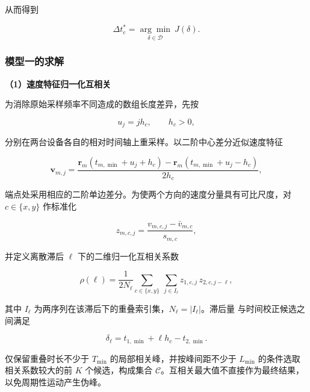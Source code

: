 从而得到

\begin{equation}
\Delta t_c^*=\underset{\delta\in\mathcal D}{\arg\min}\ J(\delta).
\label{eq:q1-optimum}
\end{equation}

\subsubsection{模型一的求解}\label{sec:q1-solution}

\noindent\textbf{（1）速度特征归一化互相关}

为消除原始采样频率不同造成的数组长度差异，先按

\begin{equation}
u_j=jh_c,\qquad h_c>0,
\label{eq:q1-corr-grid}
\end{equation}

分别在两台设备各自的相对时间轴上重采样。以二阶中心差分近似速度特征

\begin{equation}
\mathbf v_{m,j}=\frac{\mathbf r_m(t_{m,\min}+u_j+h_c)
-\mathbf r_m(t_{m,\min}+u_j-h_c)}{2h_c},
\label{eq:q1-velocity-feature}
\end{equation}

端点处采用相应的二阶单边差分。为使两个方向的速度分量具有可比尺度，对
\(c\in\{x,y\}\) 作标准化

\begin{equation}
z_{m,c,j}=\frac{v_{m,c,j}-\bar v_{m,c}}{s_{m,c}},
\label{eq:q1-standardized-velocity}
\end{equation}

并定义离散滞后 \(\ell\) 下的二维归一化互相关系数

\begin{equation}
\rho(\ell)=\frac{1}{2N_\ell}
\sum_{c\in\{x,y\}}\ \sum_{j\in I_\ell}
z_{1,c,j}\,z_{2,c,j-\ell},
\label{eq:q1-ncc}
\end{equation}

其中 \(I_\ell\) 为两序列在该滞后下的重叠索引集，\(N_\ell=|I_\ell|\)。滞后量
与时间校正候选之间满足

\begin{equation}
\delta_\ell=t_{1,\min}+\ell h_c-t_{2,\min}.
\label{eq:q1-lag-offset}
\end{equation}

仅保留重叠时长不少于 \(T_{\min}\) 的局部相关峰，并按峰间距不少于
\(L_{\min}\) 的条件选取相关系数较大的前 \(K\) 个候选，构成集合
\(\mathcal C\)。互相关最大值不直接作为最终结果，以免周期性运动产生伪峰。

